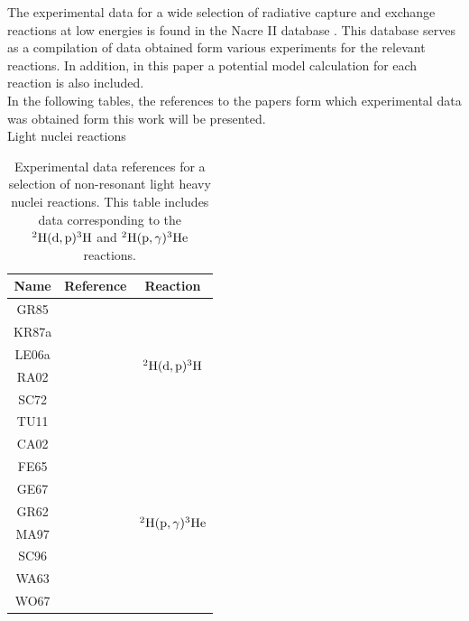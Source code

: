 \documentclass[openany]{book}
\begin{document}
The experimental data for a wide selection of radiative capture and exchange reactions at low energies is found in the Nacre II database \cite{xu_takahashi_goriely_arnould_ohta_utsunomiya_2013}. This database serves as a compilation of data obtained form various experiments for the relevant reactions. In addition, in this paper a potential model calculation for each reaction is also included.\\

In the following tables, the references to the papers form which experimental data was obtained form this work will be presented. \\

Light nuclei reactions

\begin{table}[H]
	\centering
	\begin{tabular}{|c|c|c|}
		\hline
		Name & Reference & Reaction \\ \hline
		GR85 &  \cite{greife_gorris_junker_rolfs_zahnow_1995}  &   \multirow{6}{*}{$\ddexchange$}       \\ \cline{1-2}
		KR87a &  \cite{krauss_becker_trautvetter_rolfs_brand_1987}  &         \\ \cline{1-2}
		LE06a &     \cite{leonard_karwowski_brune_fisher_ludwig_2006}  &     \\ \cline{1-2}
		RA02 &    \cite{raiola_migliardi_gyurky_aliotta_formicola_bonetti_broggini_campajola_corvisiero_costantini_et_2002}      & \\ \cline{1-2}
		SC72 &    \cite{schulte_cosack_obst_weil_1972} & \\ \cline{1-2}
		TU11 &  \cite{tumino_spitaleri_mukhamedzhanov_typel_aliotta_burjan_delsanto_kiss_kroha_hons_et_2011} & \\ \hline
		CA02 &   \cite{casella_costantini_lemut_limata_bonetti_broggini_campajola_corvisiero_cruz_donofrio_et_2002}  &   \multirow{8}{*}{$\dRadiativeCapture$}         \\ \cline{1-2}
		FE65 &  \cite{fetisov_gorbunov_varfolomeev_1965} &         \\ \cline{1-2}
		GE67 &  \cite{geller_muirhead_cohen_1967} &     \\ \cline{1-2}
		GR62 &  \cite{griffiths_larson_robertson_1962} &     \\ \cline{1-2}
		MA97 &    \cite{ma_karwowski_brune_ayer_black_blackmon_ludwig_viviani_kievsky_schiavilla_et_1997} &  \\ \cline{1-2}
		SC96  &   \cite{schmid_viviani_rice_chasteler_godwin_kiang_kiang_kievsky_laymon_prior_et_1996} & \\ \cline{1-2}
		WA63 &   \cite{warren_erdman_robertson_axen_macdonald_1963} & \\ \cline{1-2}
		WO67  &   \cite{wolfli_bosch_lang_muller_marmier_1967} & \\ \hline
	\end{tabular}
	\caption[References $\ddexchange$ and $\dRadiativeCapture$ experimental data]{Experimental data references for a selection of non-resonant light heavy nuclei reactions. This table includes data corresponding to the $\ddexchange$ and $\dRadiativeCapture$ reactions.}
	\label{table:light_nonResonant}
\end{table}
\end{document}
